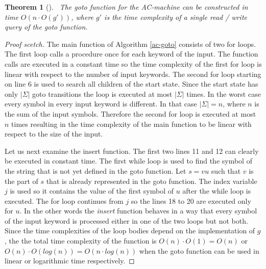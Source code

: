 \documentclass[english,twoside,censored,csm,algorithms-track-2020]{HYthesisML}
\theoremstyle{plain}
\newtheorem{theorem}{Theorem}[chapter]
\theoremstyle{definition}
\begin{document}
\begin{theorem}[]~\label{thm-time-goto}
  The goto function for the AC-machine can be constructed in time $O(n \cdot O(g'))$,
  where $g'$ is the time complexity of a single read / write query of the
  goto function.
\end{theorem}
\begin{proof}[Proof scetch]
The main function of Algorithm \ref{ac-goto} consists of two for loops.
The first loop calls a procedure once for each keyword of the input. The function calls are
executed in a constant time so the time complexity of the first for loop is linear with respect
to the number of input keywords. The second for loop starting on line 6 is used to search all
children of the start state. Since the start state has only $|\Sigma|$ goto transitions the loop
is executed at most $|\Sigma|$ times. In the worst case every symbol
in every input keyword is different. In that case $|\Sigma| = n$, where $n$ is the sum of the input
symbols. Therefore the second for loop is executed at most $n$ times resulting in the time complexity of
the main function to be linear with respect to the size of the input.

Let us next examine the insert function. The first two lines 11 and 12 can clearly be executed in
constant time. The first while loop is used to find the symbol of the string that is not yet defined
in the goto function. Let $s=vu$ such that $v$ is the part of $s$ that is already represented in the
goto function. The index variable $j$ is used so it contains the value of the first symbol of $u$ after
the while loop is executed. The for loop continues from $j$ so the lines 18 to 20 are executed
only for $u$. In the other words the \textit{insert} function behaves in a way that every symbol of
the input keyword is processed either in one of the two loops but not both. Since the time complexities
of the loop bodies depend on the implementation of $g$, the the total time complexity of the function
is $O(n)\cdot O(1) = O(n)$ or $O(n)\cdot O(log(n)) = O(n\cdot log(n))$ when the goto function
can be used in linear or logarithmic time respectively.
\end{proof}
\end{document}
